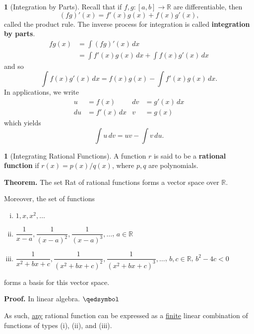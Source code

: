 \documentclass[11pt]{article}
\theoremstyle{definition}
\newtheorem{none}[thm]{}
\newcommand{\mbR}{\ensuremath{\mathbb{R}}}
\begin{document}
\begin{none}[Integration by Parts]
Recall that if $f, g : [a, b] \to \mbR$ are differentiable, then
$$(fg)'(x) = f'(x)g(x) + f(x)g'(x) \text{,}$$
called the product rule. The inverse process for integration is called \textbf{integration by parts}.
\begin{align*}
fg(x) & = \int (fg)'(x)\,dx \\
& = \int f'(x)g(x)\,dx + \int f(x)g'(x)\,dx
\end{align*}
and so
$$\int f(x)g'(x)\,dx = f(x)g(x) - \int f'(x)g(x)\,dx \text{.}$$
In applications, we write
\[ \begin{aligned}
u & = f(x) & dv & = g'(x)\,dx \\
du & = f'(x)\,dx & v & = g(x)
\end{aligned} \]
which yields
$$\int u\,dv = uv - \int v\,du \text{.}$$
\end{none}

\begin{none}[Integrating Rational Functions]
A function $r$ is said to be a \textbf{rational function} if $r(x) = p(x)/q(x)$, where $p, q$ are polynomials. 

\textbf{Theorem.} The set Rat of rational functions forms a vector space over $\mbR$. 

Moreover, the set of functions 
\begin{enumerate}[(i)] \vspace{-0.2cm}
\item $1, x, x^2, \dots$
\item $\dfrac{1}{x-a}, \dfrac{1}{(x-a)^2}, \dfrac{1}{(x-a)^3}, \dots$, $a \in \mbR$
\item $\dfrac{1}{x^2+bx+c}, \dfrac{1}{(x^2+bx+c)^2}, \dfrac{1}{(x^2 + bx + c)^3}, \dots$, $b, c \in \mbR$, $b^2 - 4c < 0$
\end{enumerate}
forms a basis for this vector space. 

\textbf{Proof.} In linear algebra. $\qedsymbol$ 

As such, \underline{any} rational function can be expressed as a \underline{finite} linear combination of functions of types (i), (ii), and (iii).
\end{none}
\end{document}
